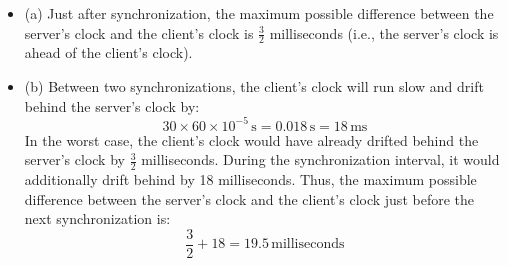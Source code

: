 \begin{itemize}
    \item (a) Just after synchronization, the maximum possible difference between the server's clock and the client's clock is \( \frac{3}{2} \) milliseconds (i.e., the server's clock is ahead of the client's clock).
    \item (b) Between two synchronizations, the client's clock will run slow and drift behind the server's clock by:
    \[
    30 \times 60 \times 10^{-5} \, \text{s} = 0.018 \, \text{s} = 18 \, \text{ms}
    \]
    In the worst case, the client's clock would have already drifted behind the server's clock by \( \frac{3}{2} \) milliseconds. During the synchronization interval, it would additionally drift behind by 18 milliseconds. Thus, the maximum possible difference between the server's clock and the client's clock just before the next synchronization is:
    \[
    \frac{3}{2} + 18 = 19.5 \, \text{milliseconds}
    \]
\end{itemize}
